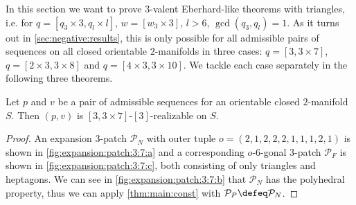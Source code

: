 \label{sec:3:3}

In this section we want to prove $3$-valent {\sc Eberhard}-like theorems with triangles, i.e. for $q = [q_3 \times 3, q_l \times l]$, $w = [w_3 \times 3]$, $l > 6$, $\gcd(q_3, q_l) = 1$. As it turns out in \autoref{sec:negative:results}, this is only possible for all admissible pairs of sequences on all closed orientable $2$-manifolds in three cases: $q = [3, 3 \times 7]$, $q = [2 \times 3, 3 \times 8]$ and $q = [4 \times 3, 3 \times 10]$. We tackle each case separately in the following three theorems.
\clearpage
\begin{theorem}
  Let $p$ and $v$ be a pair of admissible sequences for an orientable closed $2$-manifold $S$. Then $(p, v)$ is $[3, 3 \times 7]$-$[3]$-realizable on $S$.
  \begin{proof}
    An expansion $3$-patch $\mathcal{P}_N$ with outer tuple $o = (2, 1, 2, 2, 2, 1, 1, 1, 2, 1)$ is shown in \autoref{fig:expansion:patch:3:7:a} and a corresponding $o$-$6$-gonal $3$-patch $\mathcal{P}_F$ is shown in \autoref{fig:expansion:patch:3:7:c}, both consisting of only triangles and heptagons. We can see in \autoref{fig:expansion:patch:3:7:b} that $\mathcal{P}_N$ has the polyhedral property, thus we can apply \autoref{thm:main:const} with $\mathcal{P}_P \defeq \mathcal{P}_N$.
  \end{proof}
\end{theorem}
{\par\vspace*{\fill}}
